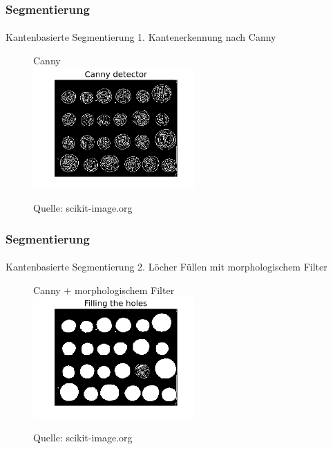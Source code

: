 \documentclass{beamer}
\begin{document}
\begin{frame}
    \frametitle{Segmentierung}
\framesubtitle{}
\begin{block}{Kantenbasierte Segmentierung }
1. Kantenerkennung nach Canny
\end{block}
\begin{figure}[htp]
      \centering
Canny \\
    \includegraphics[width=0.55\textwidth]{img/segmentation_edge2} 
      \caption{Quelle: scikit-image.org}
\end{figure}


 \end{frame}



\begin{frame}
    \frametitle{Segmentierung}
\framesubtitle{}
\begin{block}{Kantenbasierte Segmentierung }
2. Löcher Füllen mit morphologischem Filter
\end{block}
\begin{figure}[htp]
      \centering
Canny + morphologischem Filter \\
    \includegraphics[width=0.55\textwidth]{img/segmentation_edge3} 
      \caption{Quelle: scikit-image.org}
\end{figure}


 \end{frame}
\end{document}
